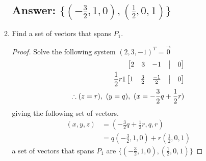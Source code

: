 \documentclass[12pt]{article}
\begin{document}
\begin{enumerate}
\begin{enumerate}
                      \subsection{Answer: $\{(-\frac{3}{2}, 1, 0), (\frac{1}{2}, 0, 1)\}$}
                      \item Find a set of vectors that spans $P_1$.
                            \begin{proof}
                                    Solve the following system $(2, 3, -1)^{T} = \vec{0}$
                                    \begin{align*}
                                            \begin{bmatrix}
                                                    2 & 3 & -1 & \bigm| & 0 \\
                                            \end{bmatrix}
                                            \\ \frac{1}{2} r1
                                            \begin{bmatrix}
                                                    1 & \frac{3}{2} & \frac{-1}{2} & \bigm| & 0 \\
                                            \end{bmatrix}
                                            \\
                                            \therefore (z=r),\ (y=q),\ (x=-\frac{3}{2}q+\frac{1}{2}r)
                                    \end{align*}
                                    giving the following set of vectors.
                                    \begin{align*}
                                            (x,y,z) & = (-\frac{3}{2}q+\frac{1}{2}r, q, r)           \\
                                                    & = q(-\frac{3}{2}, 1, 0) + r(\frac{1}{2}, 0, 1)
                                    \end{align*}
                                    a set of vectors that spans $P_1$ are $\{(-\frac{3}{2}, 1, 0), (\frac{1}{2}, 0, 1)\}$
                            \end{proof}

\end{enumerate}
\end{enumerate}
\end{document}
